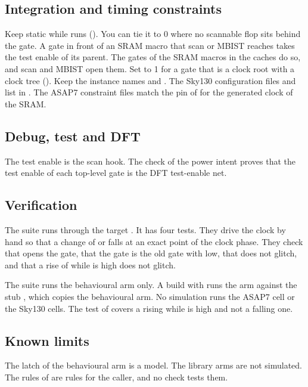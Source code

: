 

\subsection{Integration and timing constraints}
Keep  static while  runs (). You can tie it to 0 where no scannable flop sits behind the gate. A gate in front of an SRAM macro that scan or MBIST reaches takes the test enable of its parent. The gates of the SRAM macros in the caches do so, and scan and MBIST open them. Set  to 1 for a gate that is a clock root with a clock tree (). Keep the instance names  and . The Sky130 configuration files  and  list  in . The ASAP7 constraint files match the pin of  for the generated clock of the SRAM.

\subsection{Debug, test and DFT}
The test enable is the scan hook. The check of the power intent proves that the test enable of each top-level gate is the DFT test-enable net.

\subsection{Verification}
The suite  runs through the target . It has four tests. They drive the clock by hand so that a change of  or  falls at an exact point of the clock phase. They check that  opens the gate, that the gate is the old gate with  low, that  does not glitch, and that a rise of  while  is high does not glitch.

The suite runs the behavioural arm only. A build with  runs the  arm against the stub , which copies the behavioural arm. No simulation runs the ASAP7 cell or the Sky130 cells. The test of  covers a rising  while  is high and not a falling one.

\subsection{Known limits}
The latch of the behavioural arm is a model. The library arms are not simulated. The rules of  are rules for the caller, and no check tests them.


